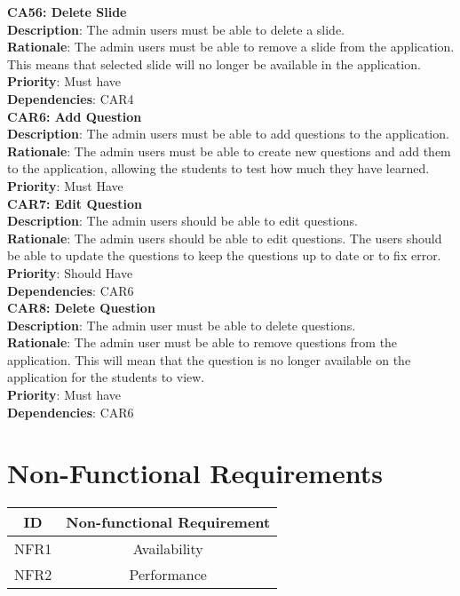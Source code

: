 \documentclass{l3proj}
\begin{document}
\textbf{CA56: Delete Slide}\\
\textbf{Description}: The admin users must be able to delete a slide.\\ 
\textbf{Rationale}: The admin users must be able to remove a slide from the application. This means that selected slide will no longer be available in the application.\\
\textbf{Priority}: Must have\\
\textbf{Dependencies}: CAR4\\

\textbf{CAR6: Add Question}\\
\textbf{Description}: The admin users must be able to add questions to the application. \\
\textbf{Rationale}: The admin users must be able to create new questions and add them to the application, allowing the students to test how much they have learned.\\
\textbf{Priority}: Must Have\\

\textbf{CAR7: Edit Question}\\
\textbf{Description}: The admin users should be able to edit questions.\\
\textbf{Rationale}: The admin users should be able to edit questions. The users should be able to update the questions to keep the questions up to date or to fix error.\\
\textbf{Priority}: Should Have \\
\textbf{Dependencies}: CAR6\\

\textbf{CAR8: Delete Question}\\
\textbf{Description}: The admin user must be able to delete questions. \\
\textbf{Rationale}:  The admin user must be able to remove questions from the application. This will mean that the question is no longer available on the application for the students to view.\\
\textbf{Priority}: Must have\\
\textbf{Dependencies}: CAR6\\

\section{Non-Functional Requirements}

\begin{center}
\begin{tabular}{|c|c|}
\hline \textbf{ID} & \textbf{Non-functional Requirement}\\
\hline NFR1 & Availability\\
\hline NFR2 & Performance\\
\hline
\end{tabular}
\end{center}
\end{document}
